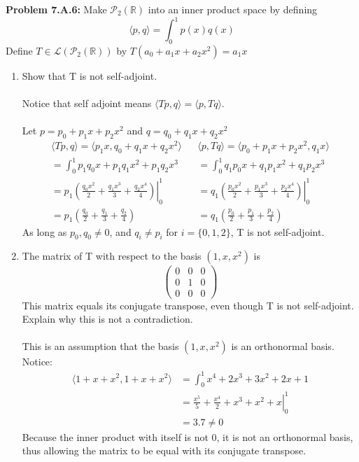 \documentclass[12pt]{article}
\begin{document}
\noindent \textbf{Problem 7.A.6: }Make $\mathcal{P}_2(\mathbb{R})$ into an inner product space by defining
	$$
	\langle p,q \rangle = \int_{0}^{1} p(x)q(x)
	$$
Define $T \in \mathcal{L}(\mathcal{P}_2(\mathbb{R}))$ by $T(a_0 + a_1x + a_2x^2) = a_1x$
	\begin{enumerate}[label = (\alph*)]
		\item  Show that T is not self-adjoint.
		\\ \\
		Notice that self adjoint means $\langle Tp,q \rangle = \langle p, Tq \rangle$.
		\\ \\
		Let $p = p_0 + p_1x + p_2x^2$ and $q = q_0 + q_1x + q_2x^2$
			\begin{align*}
				\langle Tp,q \rangle = \langle p_1x, q_0 + q_1x + q_2x^2 \rangle && \langle p,Tq \rangle = \langle p_0 + p_1x + p_2x^2, q_1x \rangle\\
				= \int_{0}^{1} p_1q_0x + p_1q_1x^2 + p_1q_2x^3 && =\int_{0}^{1} q_1p_0x + q_1p_1x^2 + q_1p_2x^3 \\
				= \left. p_1 \left( \frac{q_0x^2}{2} + \frac{q_1x^3}{3} + \frac{q_2x^4}{4} \right) \right|^{1}_0 && =\left. q_1 \left( \frac{p_0x^2}{2} + \frac{p_1x^3}{3} + \frac{p_2x^4}{4} \right) \right|^{1}_0\\
				= p_1 \left( \frac{q_0}{2} + \frac{q_1}{3} + \frac{q_2}{4} \right) && =q_1 \left( \frac{p_0}{2} + \frac{p_1}{3} + \frac{p_2}{4} \right)
			\end{align*}
		As long as $p_0,q_0 \not = 0$, and $q_i \not= p_i$ for $i = \{0,1,2\}$, T is not self-adjoint.
		\item The matrix of T with respect to the basis $(1, x, x^2)$ is
			$$
			\begin{pmatrix}
				0 & 0 & 0 \\
				0 & 1 & 0 \\
				0 & 0 & 0 	
			\end{pmatrix}
			$$
		This matrix equals its conjugate transpose, even though T is not
		self-adjoint. Explain why this is not a contradiction.
		\\ \\
		This is an assumption that the basis $(1, x, x^2)$ is an orthonormal basis.  Notice:
			\begin{align*}
			\langle 1 + x + x^2, 1 + x + x^2 \rangle &= \int_{0}^{1} x^4 + 2 x^3 + 3 x^2 + 2 x + 1 \\
			&= \left. \frac{x^5}{5} + \frac{x^4}{2} + x^3 + x^2 + x \right|^1_0 \\
 			&= 3.7 \not = 0		
 			\end{align*}
 		Because the inner product with itself is not 0, it is not an orthonormal basis, thus allowing the matrix to be equal with its conjugate transpose.
	\end{enumerate}	
	
\end{document}
